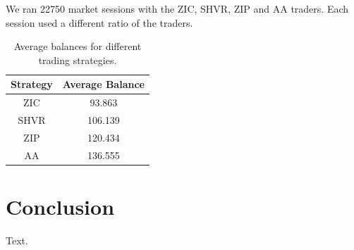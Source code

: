 \documentclass{acm_proc_article-sp}
\begin{document}
We ran 22750 market sessions with the ZIC, SHVR, ZIP and AA traders.
Each session used a different ratio of the traders.

\begin{table}
  \centering
  \begin{tabular}{ | c | c | }
    \hline
    Strategy & Average Balance \\
    \hline
    ZIC & 93.863 \\
    \hline
    SHVR & 106.139 \\
    \hline
    ZIP & 120.434 \\
    \hline
    AA & 136.555 \\
    \hline
  \end{tabular}
  \caption{Average balances for different trading strategies.}
  \label{tbl:results}
\end{table}


\section{Conclusion} \label{sec:conclusion}
Text.\\




\end{document}
